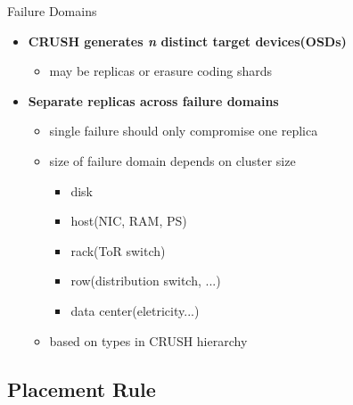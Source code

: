 \begin{frame}{Failure Domains}
    \begin{itemize}
        \item \textbf{CRUSH generates \textit{n} distinct target devices(OSDs)}
            \begin{itemize}
                \item may be replicas or erasure coding shards
            \end{itemize}
        \item \textbf{Separate replicas across failure domains}
            \begin{itemize}
                \item single failure should only compromise one replica
                \item size of failure domain depends on cluster size
                    \begin{itemize}
                        \item disk
                        \item host(NIC, RAM, PS)
                        \item rack(ToR switch)
                        \item row(distribution switch, ...)
                        \item data center(eletricity...)
                    \end{itemize}
                \item based on types in CRUSH hierarchy
            \end{itemize}
    \end{itemize}
\end{frame}

\subsection{Placement Rule}



